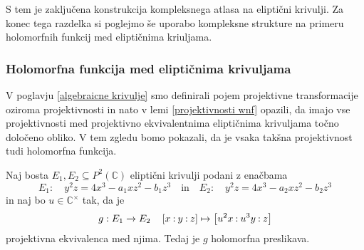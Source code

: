 \documentclass[mat1]{fmfdelo}
\numberwithin{equation}{section}
\newcommand{\CM}{\mathbb C ^\times}
\newcommand{\PC}{P^2(\mathbb C)}
\newcommand{\pcoor}[1]{%
\begingroup\lccode`~=`: \lowercase{\endgroup
\edef~}{\mathbin{\mathchar\the\mathcode`:}\nobreak}%
\left[%
\begingroup
\mathcode`:=\string"8000
#1%
\endgroup
\right]%
}
\theoremstyle{definition}
\begin{document}
S tem je zaključena konstrukcija kompleksnega atlasa na eliptični krivulji. Za konec tega razdelka si poglejmo še uporabo kompleksne strukture na primeru holomorfnih funkcij med eliptičnima kriuljama.  

\subsubsection{Holomorfna funkcija med eliptičnima krivuljama}
    V poglavju \ref{algebraicne krivulje} smo definirali pojem projektivne transformacije oziroma projektivnosti in nato v lemi \ref{projektivnosti wnf} opazili, da imajo vse projektivnosti med projektivno ekvivalentnima eliptičnima krivuljama točno določeno obliko. V tem zgledu bomo pokazali, da je vsaka takšna projektivnost tudi holomorfna funkcija. 

\begin{trditev}
    Naj bosta $E_1, E_2 \subseteq \PC$ eliptični krivulji podani z enačbama 
    \[
        E_1 : \quad y^2z = 4x^3 - a_1xz^2 - b_1z^3 \quad \text {in} \quad
        E_2 : \quad y^2z = 4x^3 - a_2xz^2 - b_2z^3
    \]
    in naj bo $u \in \CM$ tak, da je
    \[
        g: E_1 \to E_2 \quad \pcoor{x : y : z} \mapsto \pcoor{u^2x : u^3y : z}  
    \]
    projektivna ekvivalenca med njima. Tedaj je $g$ holomorfna preslikava.  
\end{trditev}
\end{document}
